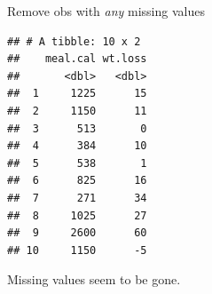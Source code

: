 \documentclass[
  ignorenonframetext,
]{beamer}
\newenvironment{Shaded}{\begin{snugshade}}{\end{snugshade}}
\newcommand{\DecValTok}[1]{\textcolor[rgb]{0.00,0.00,0.81}{#1}}
\newcommand{\KeywordTok}[1]{\textcolor[rgb]{0.13,0.29,0.53}{\textbf{#1}}}
\newcommand{\NormalTok}[1]{#1}
\newcommand{\OperatorTok}[1]{\textcolor[rgb]{0.81,0.36,0.00}{\textbf{#1}}}
\newcommand{\StringTok}[1]{\textcolor[rgb]{0.31,0.60,0.02}{#1}}
\begin{document}
\begin{frame}[fragile]{Remove obs with \emph{any} missing values}
\protect\hypertarget{remove-obs-with-any-missing-values}{}

\small

\begin{Shaded}
\end{Shaded}

\begin{verbatim}
## # A tibble: 10 x 2
##    meal.cal wt.loss
##       <dbl>   <dbl>
##  1     1225      15
##  2     1150      11
##  3      513       0
##  4      384      10
##  5      538       1
##  6      825      16
##  7      271      34
##  8     1025      27
##  9     2600      60
## 10     1150      -5
\end{verbatim}

\normalsize

Missing values seem to be gone.

\end{frame}
\end{document}
